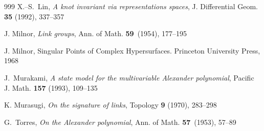 \documentclass[11pt,reqno]{amsart}
\theoremstyle{definition}
\begin{document}
\begin{thebibliography}{999}
X.--S.~Lin, \emph{A knot invariant via representations spaces},
J. Differential Geom. \textbf{35} (1992), 337--357


J. Milnor, \emph{Link groups}, Ann. of Math. \textbf{59}~(1954), 177--195

J. Milnor, Singular Points of Complex Hypersurfaces. Princeton University Press, 1968

J.~Murakami, \emph{A state model for the multivariable Alexander polynomial}, Pacific J. Math. \textbf{157} (1993), 109--135

K. Murasugi, \emph{On the signature of links}, Topology \textbf{9} (1970), 283--298

G.~Torres, \emph{On the Alexander polynomial}, Ann. of Math. \textbf{57}~(1953), 57--89

\end{thebibliography}



%
%
\end{document}
